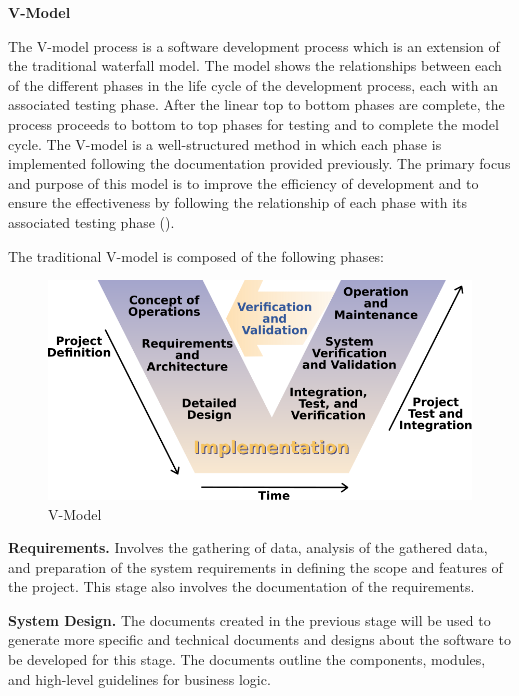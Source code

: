 \flushleft
\textbf{V-Model}\\
\justifying

\parx
The V-model process is a software development process which is an extension of
the traditional waterfall model. The model shows the relationships between each
of the different phases in the life cycle of the development process, each with
an associated testing phase. After the linear top to bottom phases are complete,
the process proceeds to bottom to top phases for testing and to complete the
model cycle. The V-model is a well-structured method in which each phase is
implemented following the documentation provided previously. The primary focus
and purpose of this model is to improve the efficiency of development and to
ensure the effectiveness by following the relationship of each phase with its
associated testing phase (\cite{rook_1986}).

\parx
The traditional V-model is composed of the following phases:

\begin{figure}[H]
	\includegraphics[width=\linewidth]{figures/v_model.png}
	\caption{V-Model}
	\label{fig:v_model}
\end{figure}

\parx
\textbf{Requirements.}
\justifying
Involves the gathering of data, analysis of the gathered data, and preparation
of the system requirements in defining the scope and features of the project.
This stage also involves the documentation of the requirements.

\parx
\textbf{System Design.}
\justifying
The documents created in the previous stage will be used to generate more
specific and technical documents and designs about the software to be developed
for this stage. The documents outline the components, modules, and high-level
guidelines for business logic.

